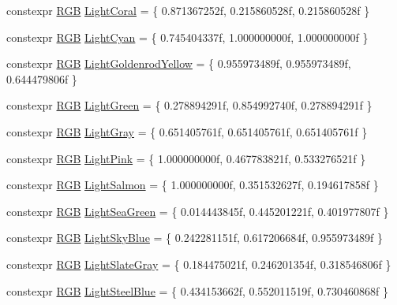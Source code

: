 \begin{DoxyCompactItemize}
\item 
constexpr \mbox{\hyperlink{structmage_1_1_r_g_b}{R\+GB}} \mbox{\hyperlink{namespacemage_1_1color_ad8d2691e5afda566e2310392eff4d591}{Light\+Coral}} = \{ 0.\+871367252f, 0.\+215860528f, 0.\+215860528f \}
\item 
constexpr \mbox{\hyperlink{structmage_1_1_r_g_b}{R\+GB}} \mbox{\hyperlink{namespacemage_1_1color_a33ec927401f051a6271841f78e67564f}{Light\+Cyan}} = \{ 0.\+745404337f, 1.\+000000000f, 1.\+000000000f \}
\item 
constexpr \mbox{\hyperlink{structmage_1_1_r_g_b}{R\+GB}} \mbox{\hyperlink{namespacemage_1_1color_a60013d7d47356017384ab70bf9a6e1ac}{Light\+Goldenrod\+Yellow}} = \{ 0.\+955973489f, 0.\+955973489f, 0.\+644479806f \}
\item 
constexpr \mbox{\hyperlink{structmage_1_1_r_g_b}{R\+GB}} \mbox{\hyperlink{namespacemage_1_1color_a8229e71bb1cae46b47e2c415ac4b43ea}{Light\+Green}} = \{ 0.\+278894291f, 0.\+854992740f, 0.\+278894291f \}
\item 
constexpr \mbox{\hyperlink{structmage_1_1_r_g_b}{R\+GB}} \mbox{\hyperlink{namespacemage_1_1color_aadf052403392216e671d0ac1b18d1909}{Light\+Gray}} = \{ 0.\+651405761f, 0.\+651405761f, 0.\+651405761f \}
\item 
constexpr \mbox{\hyperlink{structmage_1_1_r_g_b}{R\+GB}} \mbox{\hyperlink{namespacemage_1_1color_a2211bc4700514d59df25b53387aa1d32}{Light\+Pink}} = \{ 1.\+000000000f, 0.\+467783821f, 0.\+533276521f \}
\item 
constexpr \mbox{\hyperlink{structmage_1_1_r_g_b}{R\+GB}} \mbox{\hyperlink{namespacemage_1_1color_a0ea813bec32974b56714ee519d3fd738}{Light\+Salmon}} = \{ 1.\+000000000f, 0.\+351532627f, 0.\+194617858f \}
\item 
constexpr \mbox{\hyperlink{structmage_1_1_r_g_b}{R\+GB}} \mbox{\hyperlink{namespacemage_1_1color_a1e3d4448a15e0fac347da747ad2647a2}{Light\+Sea\+Green}} = \{ 0.\+014443845f, 0.\+445201221f, 0.\+401977807f \}
\item 
constexpr \mbox{\hyperlink{structmage_1_1_r_g_b}{R\+GB}} \mbox{\hyperlink{namespacemage_1_1color_a9fd52a16c2c4ace303c2e1d6d33556af}{Light\+Sky\+Blue}} = \{ 0.\+242281151f, 0.\+617206684f, 0.\+955973489f \}
\item 
constexpr \mbox{\hyperlink{structmage_1_1_r_g_b}{R\+GB}} \mbox{\hyperlink{namespacemage_1_1color_a03509d568368a4918213130a9f44f55c}{Light\+Slate\+Gray}} = \{ 0.\+184475021f, 0.\+246201354f, 0.\+318546806f \}
\item 
constexpr \mbox{\hyperlink{structmage_1_1_r_g_b}{R\+GB}} \mbox{\hyperlink{namespacemage_1_1color_a5ecb57996411f6b8927bfafb204208a3}{Light\+Steel\+Blue}} = \{ 0.\+434153662f, 0.\+552011519f, 0.\+730460868f \}

\end{DoxyCompactItemize}
